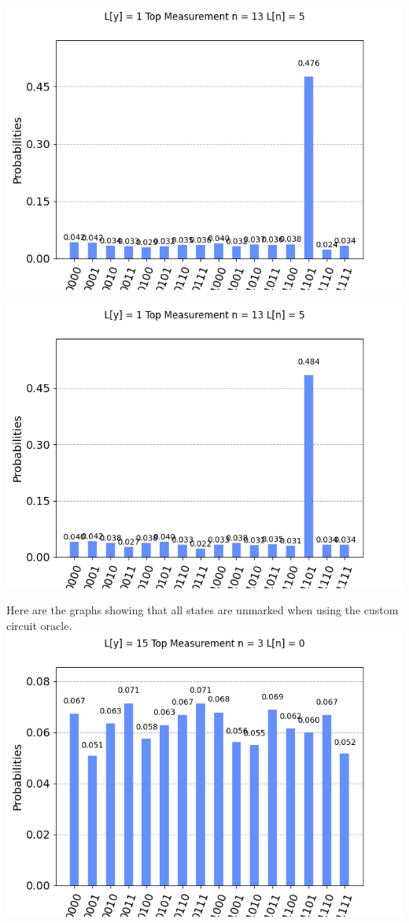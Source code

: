 \documentclass[11pt]{article}
\begin{document}
\includegraphics[width=\textwidth]{logical_3.png}
\centering

\includegraphics[width=\textwidth]{logical_4.png}
\centering

\newpage
Here are the graphs showing that all states are unmarked when using the custom circuit oracle.
\includegraphics[width=\textwidth]{custom_0.png}
\centering
\end{document}
